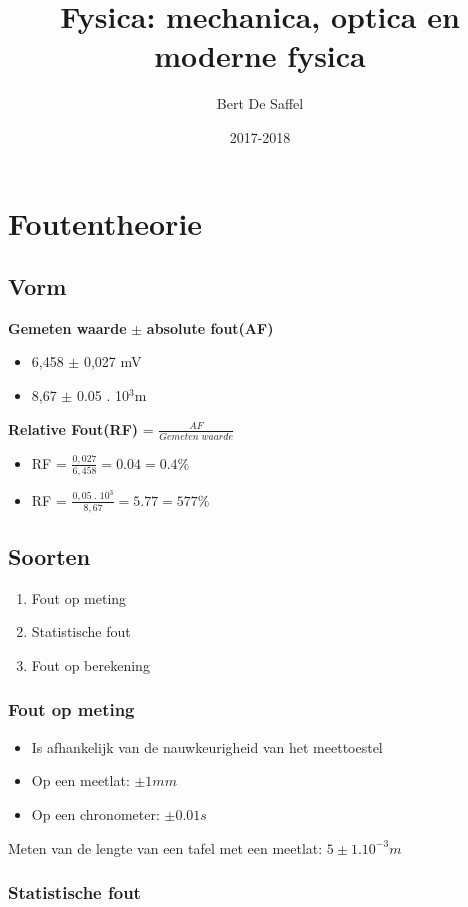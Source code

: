 \documentclass[12pt]{report}
\title{Fysica: mechanica, optica en moderne fysica}
\author{Bert De Saffel}
\date{2017-2018}
\newcommand{\important}[1] {\textbf{\color{orange}#1}}
\begin{document}
\maketitle
\tableofcontents

\chapter{Foutentheorie}
\section{Vorm}
\important{Gemeten waarde} $\pm$ \important{absolute fout(AF)}
\begin{itemize}
 \item 6,458 $\pm$ 0,027 mV
 \item 8,67  $\pm$ 0.05 . 10$^3$m
\end{itemize}
\important{Relative Fout(RF)} = $\frac{AF}{Gemeten\;waarde}$
\begin{itemize}
 \item RF = $\frac{0,027}{6,458} = 0.04 = 0.4\%$
 \item RF = $\frac{0,05\;.\;10^3}{8,67} = 5.77 = 577\%$
\end{itemize}
\section{Soorten}
\begin{enumerate}
 \item Fout op meting
 \item Statistische fout
 \item Fout op berekening
\end{enumerate}

\subsection{Fout op meting}
\begin{itemize}
 \item Is afhankelijk van de nauwkeurigheid van het meettoestel
 \item Op een meetlat: $\pm 1mm$
 \item Op een chronometer: $\pm 0.01s$
\end{itemize}
Meten van de lengte van een tafel met een meetlat: $5 \pm 1.10^{-3} m$ 

\subsection{Statistische fout}
\end{document}

